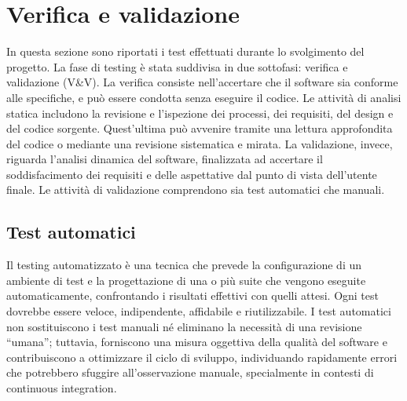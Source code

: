 \chapter{Verifica e validazione}
\label{cap:verifica-validazione}

In questa sezione sono riportati i test effettuati durante lo svolgimento del progetto. La fase di testing è stata suddivisa in due sottofasi: verifica e validazione (V\&V). La verifica consiste nell’accertare che il software sia conforme alle specifiche, e può essere condotta senza eseguire il codice. Le attività di analisi statica includono la revisione e l’ispezione dei processi, dei \gls{requisiti}, del design e del codice sorgente. Quest’ultima può avvenire tramite una lettura approfondita del codice o mediante una revisione sistematica e mirata. La validazione, invece, riguarda l’analisi dinamica del software, finalizzata ad accertare il soddisfacimento dei \gls{requisiti} e delle aspettative dal punto di vista dell’utente finale. Le attività di validazione comprendono sia test automatici che manuali.


\section{Test automatici}

Il testing automatizzato è una tecnica che prevede la configurazione di un ambiente di test e la progettazione di una o più suite che vengono eseguite automaticamente, confrontando i risultati effettivi con quelli attesi. Ogni test dovrebbe essere veloce, indipendente, affidabile e riutilizzabile. I test automatici non sostituiscono i test manuali né eliminano la necessità di una revisione “umana”; tuttavia, forniscono una misura oggettiva della qualità del software e contribuiscono a ottimizzare il ciclo di sviluppo, individuando rapidamente errori che potrebbero sfuggire all’osservazione manuale, specialmente in contesti di \gls{continuous integration}.

